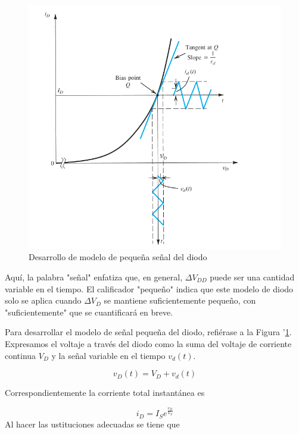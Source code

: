 \begin{figure}
    \centering
    \includegraphics[scale=0.6]{Electronica/diodo_f9.png}
    \caption{Desarrollo de modelo de pequeña señal del diodo}
    \label{fig_ModeloPequenaSenalDiodo}
\end{figure}

Aquí, la palabra "señal" enfatiza que, en general, \( \Delta V_{DD} \) puede ser una cantidad variable en el tiempo. El calificador "pequeño" indica que este modelo de diodo solo se aplica cuando \( \Delta V_D \) se mantiene suficientemente pequeño, con "suficientemente" que se cuantificará en breve.

Para desarrollar el modelo de señal pequeña del diodo, refiérase a la Figura '\ref{fig_ModeloPequenaSenalDiodo}. Expresamos el voltaje a través del diodo como la suma del voltaje de corriente continua \( V_D \) y la señal variable en el tiempo \( v_d(t) \).

\begin{equation*}
v_D (t) = V_D + v_d (t)
\end{equation*}

Correspondientemente la corriente total instantánea es

\begin{equation*}
i_D = I_S e^{\frac{v_D}{V_T}}
\end{equation*}
Al hacer las ustituciones adecuadas se tiene que 

